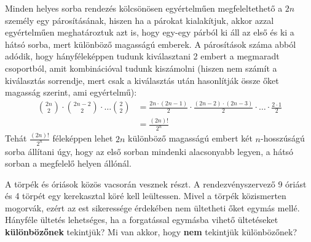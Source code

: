\begin{solution}
Minden helyes sorba rendezés kölcsönösen egyértelműen megfeleltethető
a $2n$ személy egy párosításának, hiszen ha a párokat kialakítjuk,
akkor azzal egyértelműen meghatároztuk azt is, hogy egy-egy párból
ki áll az első és ki a hátsó sorba, mert különböző magasságú emberek.
A párosítások száma abból adódik, hogy hányféleképpen tudunk kiválasztani
2 embert a megmaradt csoportból, amit kombinációval tudunk kiszámolni
(hiszen nem számít a kiválasztás sorrendje, mert csak a kiválasztás
után hasonlítják össze őket magasság szerint, ami egyértelmű): 
\begin{align*}
\binom{2n}{2}\cdot\binom{2n-2}{2}\cdot\ldots\binom{2}{2} & =\frac{2n\cdot(2n-1)}{2}\cdot\frac{(2n-2)\cdot(2n-3)}{2}\cdot\ldots\cdot\frac{2\cdot1}{2}\\
 & =\frac{(2n)!}{2^{n}}
\end{align*}
Tehát $\frac{(2n)!}{2^{n}}$ féleképpen lehet $2n$ különböző magasságú
embert két $n$-hosszúságú sorba állítani úgy, hogy az első sorban
mindenki alacsonyabb legyen, a hátsó sorban a megfelelő helyen állónál. 
\end{solution}
\begin{extraproblem}
A törpék és óriások közös vacsorán vesznek részt. A rendezvényszervező
9 óriást és 4 törpét egy kerekasztal köré kell leültessen. Mivel a
törpék közismerten mogorvák, ezért az est sikeressége érdekében nem
ültetheti őket egymás mellé. Hányféle ültetés lehetséges, ha a forgatással
egymásba vihető ültetéseket \textbf{különbözőnek} tekintjük? Mi van
akkor, hogy \textbf{nem} tekintjük különbözőnek?
\end{extraproblem}

